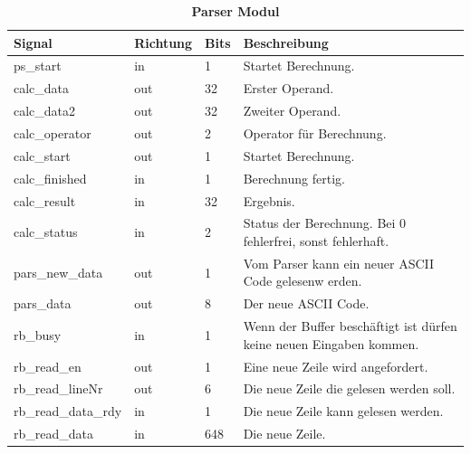 \begin{table}[!h]
\caption{\textbf{Parser Modul}}
 \begin{center}
  \begin{tabular}{|p{4cm}|p{}|p{1cm}|p{9cm}|}
   \hline Signal & Richtung & Bits & Beschreibung\\
   \hline
   ps\_start & in & 1 & Startet Berechnung.\\
   calc\_data & out & 32 & Erster Operand.\\
   calc\_data2 & out & 32 & Zweiter Operand.\\
   calc\_operator & out & 2 & Operator für Berechnung.\\
   calc\_start & out & 1 & Startet Berechnung.\\
   calc\_finished & in & 1 & Berechnung fertig.\\
   calc\_result & in & 32 & Ergebnis.\\
   calc\_status & in & 2 & Status der Berechnung. Bei 0 fehlerfrei, sonst fehlerhaft.\\
   pars\_new\_data & out & 1 & Vom Parser kann ein neuer ASCII Code gelesenw erden.\\
   pars\_data & out & 8 & Der neue ASCII Code.\\
   rb\_busy & in & 1 & Wenn der Buffer beschäftigt ist dürfen keine neuen Eingaben kommen.\\
   rb\_read\_en & out & 1 & Eine neue Zeile wird angefordert.\\
   rb\_read\_lineNr & out & 6 & Die neue Zeile die gelesen werden soll.\\
   rb\_read\_data\_rdy & in & 1 & Die neue Zeile kann gelesen werden.\\
   rb\_read\_data & in & 648 & Die neue Zeile.\\
   \hline
  \end{tabular}
 \end{center}
\end{table}


